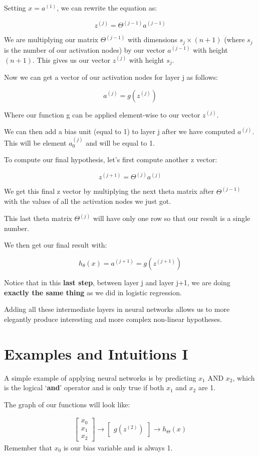 Setting $x = a^{(1)}$, we can rewrite the equation as:

\[z^{(j)} = \Theta^{(j-1)} a^{(j-1)} \]

We are multiplying our matrix $\Theta^{(j-1)}$ with dimensions $s_j\times (n+1)$ (where $s_j$ is the number of our activation nodes) by our vector $a^{(j-1)}$ with height $(n+1)$. This gives us our vector $z^{(j)}$ with height $s_j$.

Now we can get a vector of our activation nodes for layer j as follows:

$$a^{(j)} = g(z^{(j)})$$

Where our function g can be applied element-wise to our vector $z^{(j)}$.

We can then add a bias unit (equal to 1) to layer j after we have computed $a^{(j)}$. This will be element $a_0^{(j)}$ and will be equal to 1.

To compute our final hypothesis, let's first compute another z vector:

$$ z^{(j+1)} = \Theta^{(j)}a^{(j)} $$


We get this final z vector by multiplying the next theta matrix after $\Theta^{(j-1)}$ with the values of all the activation nodes we just got.

This last theta matrix $\Theta^{(j)}$ will have only one row so that our result is a single number.

We then get our final result with:

\begin{equation}
h_\theta (x) = a^{(j+1)} = g(z^{(j+1)})
\end{equation}

Notice that in this \textbf{last step}, between layer j and layer j+1, we are doing \textbf{exactly the same thing} as we did in logistic regression.

Adding all these intermediate layers in neural networks allows us to more elegantly produce interesting and more complex non-linear hypotheses.
\section{Examples and Intuitions I}
A simple example of applying neural networks is by predicting $x_1$ AND $x_2$, which is the logical `\textbf{and}' operator and is only true if both $x_1$ and $x_2$ are 1.

The graph of our functions will look like:

\begin{align*}
\begin{bmatrix}
x_0 \\ 
x_1 \\ 
x_2
\end{bmatrix} 
\rightarrow
\begin{bmatrix}
g(z^{(2)})
\end{bmatrix} 
\rightarrow 
h_\Theta(x)
\end{align*}
Remember that $x_0$ is our bias variable and is always 1.


